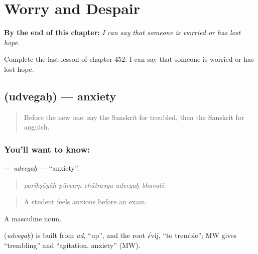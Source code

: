 
\chapter{Worry and Despair}
\label{ch:sa-worry-and-despair}

\begin{chapteropening}
\textbf{By the end of this chapter:} \emph{I can say that someone is worried or has lost hope.}

Complete the last lesson of chapter 452: I can say that someone is worried or has lost hope.
\end{chapteropening}

\section[\texorpdfstring{\sk{उद्वेगः} (udvegaḥ)}{उद्वेगः (udvegaḥ)}]{ (udvegaḥ) — anxiety}

\label{lesson:SA-C452-udvegah}



\begin{quote}
Before the new one: say the Sanskrit for troubled, then the Sanskrit for anguish.
\end{quote}

\subsection*{You'll want to know: }
\textbf{} — \emph{udvegaḥ} — \textquotedblleft{}anxiety\textquotedblright{}.

\begin{quote}
    
\end{quote}

\begin{quote}
\emph{parīkṣāyāḥ pūrvaṃ chātrasya udvegaḥ bhavati.}
\end{quote}

\begin{quote}
A student feels anxious before an exam.
\end{quote}

A masculine noun.

\begin{cousinweb}
\textbf{} (\emph{udvegaḥ}) is built from \emph{ud}, \textquotedblleft{}up\textquotedblright{}, and the root √vij, \textquotedblleft{}to tremble\textquotedblright{}; MW gives \textquotedblleft{}trembling\textquotedblright{} and \textquotedblleft{}agitation, anxiety\textquotedblright{} (MW).
\end{cousinweb}

